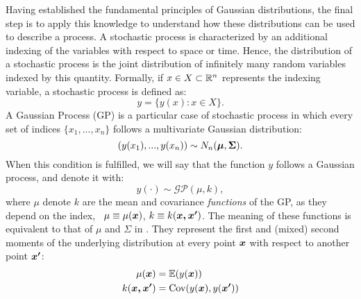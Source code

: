
Having established the fundamental principles of Gaussian distributions, the final step is to apply this knowledge to understand how these distributions can be used to describe a process. A stochastic process is characterized by an additional indexing of the variables with respect to space or time. Hence, the distribution of a stochastic process is the joint distribution of infinitely many random variables indexed by this quantity. Formally, if $x \in X \subset \mathbb{R}^n$ represents the indexing variable, a stochastic process is defined as:
\begin{equation*}
    y = \{ y(x) : x\in X\}.
\end{equation*}
A Gaussian Process (GP) is a particular case of stochastic process in which every set of indices $\{x_1,...,x_n\}$ follows a multivariate Gaussian distribution:
\begin{equation}
    (y(x_1), ..., y(x_n)) \sim N_n(\boldsymbol{\mu}, \boldsymbol{\Sigma}).
    \label{eq:gp_prior}
\end{equation}
When this condition is fulfilled, we will say that the function $y$ follows a Gaussian process, and denote it with:
\begin{equation*}
    y(\cdot)\sim\mathcal{GP}(\mu, k),
\end{equation*}
where $\mu$ denote $k$ are the mean and covariance \textit{functions} of the GP, as they depend on the index, \ie~$\mu \equiv \mu(\boldsymbol{x})$, $k \equiv k(\boldsymbol{x, x'})$. The meaning of these functions is equivalent to that of $\mu$ and $\Sigma$ in . They represent the first and (mixed) second moments of the underlying distribution at every point $\boldsymbol{x}$ with respect to another point $\boldsymbol{x'}$:
\begin{align*}
    \mu(\boldsymbol{x}) &= \mathbb{E}(y(\boldsymbol{x}))  \\
    k(\boldsymbol{x, x'}) &= \text{Cov}(y(\boldsymbol{x}), y(\boldsymbol{x'}))  \\
\end{align*}

